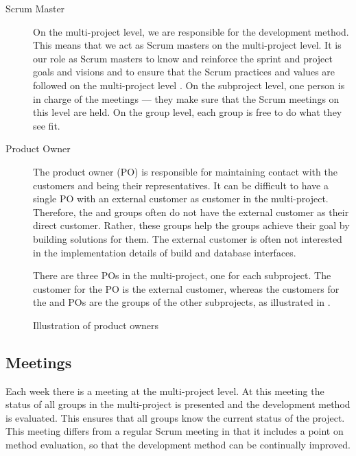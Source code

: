 \begin{description}
  \item[Scrum Master]  On the multi-project level, we are responsible for the development method. This means that we act as Scrum masters on the multi-project level. It is our role as Scrum masters to know and reinforce the sprint and project goals and visions and to ensure that the Scrum practices and values are followed on the multi-project level \cite{larman2003}. On the subproject level, one person is in charge of the meetings --- they make sure that the Scrum meetings on this level are held. On the group level, each group is free to do what they see fit.
  \item[Product Owner] The product owner (PO) is responsible for maintaining contact with the customers and being their representatives. It can be difficult to have a single PO with an external customer as customer in the multi-project. Therefore, the \bd and \db groups often do not have the external customer as their direct customer. Rather, these groups help the \gui groups achieve their goal by building solutions for them. The external customer is often not interested in the implementation details of build and database interfaces.

There are three POs in the multi-project, one for each subproject. The customer for the \gui PO is the external customer, whereas the customers for the \db and \bd POs are the groups of the other subprojects, as illustrated in .
\end{description}

\begin{figure}%
\centering
{}
\caption{Illustration of product owners}%
\label{fig:po_illu}%
\end{figure}

\subsection{Meetings}\label{sec:meetings}
Each week there is a meeting at the multi-project level. At this meeting the status of all groups in the multi-project is presented and the development method is evaluated. This ensures that all groups know the current status of the project. This meeting differs from a regular Scrum meeting in that it includes a point on method evaluation, so that the development method can be continually improved.

